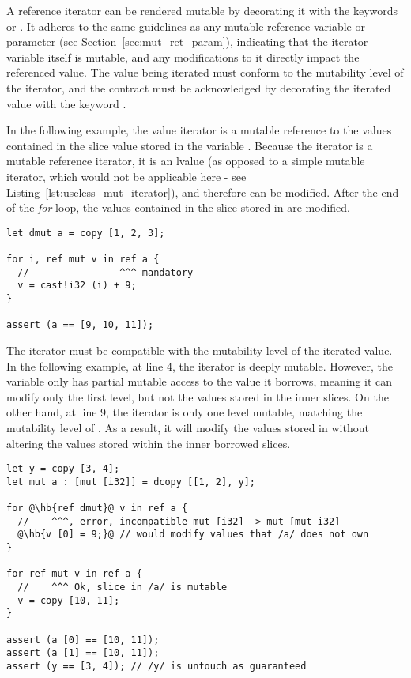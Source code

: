 A reference iterator can be rendered mutable by decorating it with the keywords
 or . It adheres to the same guidelines as any mutable
reference variable or parameter (see Section~\ref{sec:mut_ret_param}),
indicating that the iterator variable itself is mutable, and any modifications
to it directly impact the referenced value. The value being iterated must
conform to the mutability level of the iterator, and the contract must be
acknowledged by decorating the iterated value with the keyword .

In the following example, the value iterator is a mutable reference to the
values contained in the slice value stored in the variable . Because
the iterator is a mutable reference iterator, it is an lvalue (as opposed to a
simple mutable iterator, which would not be applicable here - see
Listing~\ref{lst:useless_mut_iterator}), and therefore can be modified. After
the end of the \textit{for} loop, the values contained in the slice stored in
 are modified.

\begin{lstlisting}[style=coloredverbatim, escapechar=@]
let dmut a = copy [1, 2, 3];

for i, ref mut v in ref a {
  //                ^^^ mandatory
  v = cast!i32 (i) + 9;
}

assert (a == [9, 10, 11]);
\end{lstlisting}

The iterator must be compatible with the mutability level of the iterated value.
In the following example, at line 4, the iterator is deeply mutable. However,
the variable  only has partial mutable access to the value it borrows,
meaning it can modify only the first level, but not the values stored in the
inner slices. On the other hand, at line 9, the iterator is only one level
mutable, matching the mutability level of . As a result, it will modify
the values stored in  without altering the values stored within the
inner borrowed slices.

\begin{lstlisting}[style=coloredverbatim, escapechar=@]
let y = copy [3, 4];
let mut a : [mut [i32]] = dcopy [[1, 2], y];

for @\hb{ref dmut}@ v in ref a {
  //    ^^^, error, incompatible mut [i32] -> mut [mut i32]
  @\hb{v [0] = 9;}@ // would modify values that /a/ does not own
}

for ref mut v in ref a {
  //    ^^^ Ok, slice in /a/ is mutable
  v = copy [10, 11];
}

assert (a [0] == [10, 11]);
assert (a [1] == [10, 11]);
assert (y == [3, 4]); // /y/ is untouch as guaranteed

\end{lstlisting}

